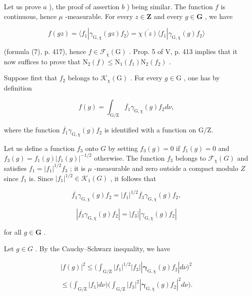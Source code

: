 Let us prove \(a\) ), the proof of assertion \(b\) ) being similar. The function \(f\) is continuous, hence \(\mu\) -measurable. For every \(z \in \mathbf{Z}\) and every \(g \in \mathbf{G}\) , we have

\[
f (g z) = \langle f _ {1} | \gamma_ {\mathrm{G}, \chi} (g z) f _ {2} \rangle = \overline {{\chi (z)}} \langle f _ {1} | \gamma_ {\mathrm{G}, \chi} (g) f _ {2} \rangle
\]

(formula (7), p. 417), hence \(f \in \mathcal{F}_{\overline{\chi}}(\mathrm{G})\) . Prop. 5 of V, p. 413 implies that it now suffices to prove that \(\mathrm{N}_2(f) \leqslant \mathrm{N}_1(f_1)\mathrm{N}_2(f_2)\) .

Suppose first that \(f_2\) belongs to \(\mathcal{K}_{\chi}(\mathrm{G})\) . For every \(g \in \mathrm{G}\) , one has by definition

\[
f (g) = \int_ {\mathrm{G/Z}} \overline {{f _ {1}}} \gamma_ {\mathrm{G}, \chi} (g) f _ {2} d \nu ,
\]

where the function \(\overline{f_1} \gamma_{\mathrm{G},\chi}(g)f_2\) is identified with a function on G/Z.

Let us define a function \(f_3\) onto \(G\) by setting \(f_3(g) = 0\) if \(f_1(g) = 0\) and \(f_3(g) = f_1(g)|f_1(g)|^{-1/2}\) otherwise. The function \(f_3\) belongs to \(\mathcal{F}_{\chi}(G)\) and satisfies \(f_1 = |f_1|^{1/2}f_3\) ; it is \(\mu\) -measurable and zero outside a compact modulo \(Z\) since \(f_1\) is. Since \(|f_1|^{1/2} \in \mathcal{K}_1(G)\) , it follows that

\[
\overline {{f _ {1}}} \gamma_ {\mathrm{G}, \chi} (g) f _ {2} = | f _ {1} | ^ {1 / 2} \overline {{f _ {3}}} \gamma_ {\mathrm{G}, \chi} (g) f _ {2},
\]

\[
| \overline {{f _ {3}}} \gamma_ {\mathrm{G}, \chi} (g) f _ {2} | = | f _ {3} | | \gamma_ {\mathrm{G}, \chi} (g) f _ {2} |
\]

for all \(g \in \mathbf{G}\) .

 Let \(g \in G\) . By the Cauchy--Schwarz inequality, we have

\[
\begin{array}{l} | f (g) | ^ {2} \leqslant \Big (\int_ {\mathrm{G/Z}} | f _ {1} | ^ {1 / 2} | f _ {3} | | \boldsymbol {\gamma} _ {\mathrm{G}, \chi} (g) f _ {2} | d \nu \Big) ^ {2} \\ \leqslant \Big (\int_ {\mathrm{G/Z}} | f _ {1} | d \nu \Big) \Big (\int_ {\mathrm{G/Z}} | f _ {3} | ^ {2} | \boldsymbol {\gamma} _ {\mathrm{G}, \chi} (g) f _ {2} | ^ {2} d \nu \Big). \end{array}
\]

